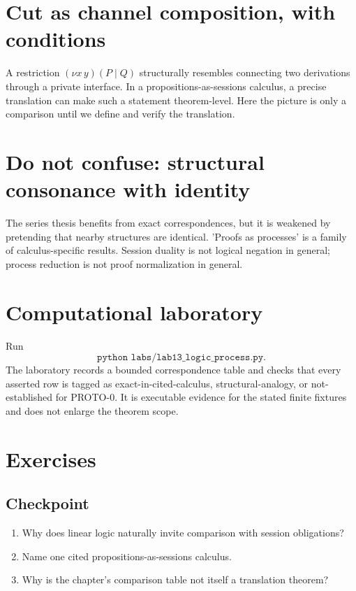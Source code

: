 \section{Cut as channel composition, with conditions}
\begin{workedexample}
A restriction $(\nu x\,y)(P\mid Q)$ structurally resembles connecting two derivations through a private interface. In a propositions-as-sessions calculus, a precise translation can make such a statement theorem-level. Here the picture is only a comparison until we define and verify the translation.
\end{workedexample}

\section{Do not confuse: structural consonance with identity}
\begin{warningbox}
The series thesis benefits from exact correspondences, but it is weakened by pretending that nearby structures are identical. 'Proofs as processes' is a family of calculus-specific results. Session duality is not logical negation in general; process reduction is not proof normalization in general.
\end{warningbox}



\section{Computational laboratory}
\begin{labbox}
Run
\[
  \texttt{python labs/lab13_logic_process.py}.
\]
The laboratory records a bounded correspondence table and checks that every asserted row is tagged as exact-in-cited-calculus, structural-analogy, or not-established for PROTO-0. It is executable evidence for the stated finite fixtures and does not enlarge the theorem scope.
\end{labbox}

\section{Exercises}
\subsection*{Checkpoint}
\begin{enumerate}[label=\textbf{13.\arabic*},start=1]
\item Why does linear logic naturally invite comparison with session obligations?
\item Name one cited propositions-as-sessions calculus.
\item Why is the chapter's comparison table not itself a translation theorem?
\end{enumerate}
